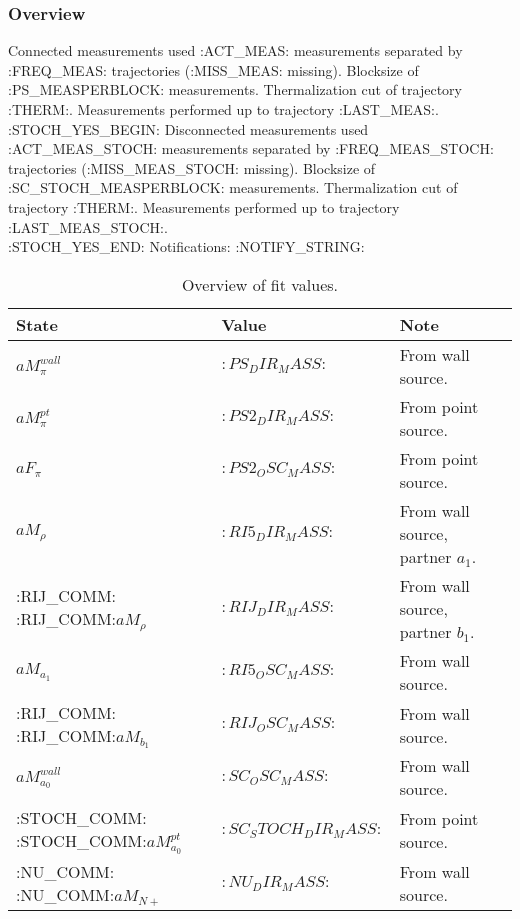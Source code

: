

\subsubsection{Overview}

Connected measurements used :ACT_MEAS: measurements separated by :FREQ_MEAS: trajectories (:MISS_MEAS: missing). Blocksize of :PS_MEASPERBLOCK: measurements. Thermalization cut of trajectory :THERM:. Measurements performed up to trajectory :LAST_MEAS:. 
~\\
:STOCH_YES_BEGIN:
\noindent Disconnected measurements used :ACT_MEAS_STOCH: measurements separated by :FREQ_MEAS_STOCH: trajectories (:MISS_MEAS_STOCH: missing). Blocksize of :SC_STOCH_MEASPERBLOCK: measurements. Thermalization cut of trajectory :THERM:. Measurements performed up to trajectory :LAST_MEAS_STOCH:.
~\\
:STOCH_YES_END:
\noindent Notifications: :NOTIFY_STRING:

\begin{table}[ht!]
\centering
\begin{tabular}{|l|l|l|}
\hline
 State & Value & Note \\
\hline
 $aM_\pi^{wall}$ & $:PS_DIR_MASS:$ & From wall source. \\
\hline
 $aM_\pi^{pt}$ & $:PS2_DIR_MASS:$ & From point source. \\
\hline
 $aF_\pi$ & $:PS2_OSC_MASS:$ & From point source. \\
\hline
 $aM_{\rho}$ & $:RI5_DIR_MASS:$ & From wall source, partner $a_1$. \\
:RIJ_COMM:\hline
 :RIJ_COMM:$aM_{\rho}$ & $:RIJ_DIR_MASS:$ & From wall source, partner $b_1$.\\
\hline
 $aM_{a_1}$ & $:RI5_OSC_MASS:$ & From wall source. \\
:RIJ_COMM:\hline
 :RIJ_COMM:$aM_{b_1}$ & $:RIJ_OSC_MASS:$ & From wall source.\\
\hline
 $aM_{a_0}^{wall}$ & $:SC_OSC_MASS:$ & From wall source. \\
:STOCH_COMM:\hline
 :STOCH_COMM:$aM_{a_0}^{pt}$ & $:SC_STOCH_DIR_MASS:$ & From point source. \\
:NU_COMM:\hline
 :NU_COMM:$aM_{N+}$ & $:NU_DIR_MASS:$ & From wall source. \\
\hline
\end{tabular}
\caption{Overview of fit values.}
\end{table}

\clearpage

